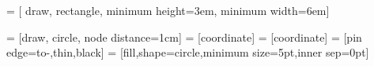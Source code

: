  = [
	draw, 
	rectangle, 
	minimum height=3em, 
	minimum width=6em]

 = [draw, circle, node distance=1cm]
 = [coordinate]
 = [coordinate]
 = [pin edge={to-,thin,black}]
 = [fill,shape=circle,minimum size=5pt,inner sep=0pt]

